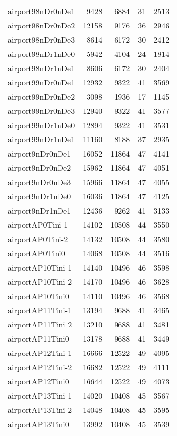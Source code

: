 \begin{longtable}{lrrrr}
airport98nDr0nDe1 & 9428 & 6884 & 31 & 2513 \\
airport98nDr0nDe2 & 12158 & 9176 & 36 & 2946 \\
airport98nDr0nDe3 & 8614 & 6172 & 30 & 2412 \\
airport98nDr1nDe0 & 5942 & 4104 & 24 & 1814 \\
airport98nDr1nDe1 & 8606 & 6172 & 30 & 2404 \\
airport99nDr0nDe1 & 12932 & 9322 & 41 & 3569 \\
airport99nDr0nDe2 & 3098 & 1936 & 17 & 1145 \\
airport99nDr0nDe3 & 12940 & 9322 & 41 & 3577 \\
airport99nDr1nDe0 & 12894 & 9322 & 41 & 3531 \\
airport99nDr1nDe1 & 11160 & 8188 & 37 & 2935 \\
airport9nDr0nDe1 & 16052 & 11864 & 47 & 4141 \\
airport9nDr0nDe2 & 15962 & 11864 & 47 & 4051 \\
airport9nDr0nDe3 & 15966 & 11864 & 47 & 4055 \\
airport9nDr1nDe0 & 16036 & 11864 & 47 & 4125 \\
airport9nDr1nDe1 & 12436 & 9262 & 41 & 3133 \\
airportAP0Tini-1 & 14102 & 10508 & 44 & 3550 \\
airportAP0Tini-2 & 14132 & 10508 & 44 & 3580 \\
airportAP0Tini0 & 14068 & 10508 & 44 & 3516 \\
airportAP10Tini-1 & 14140 & 10496 & 46 & 3598 \\
airportAP10Tini-2 & 14170 & 10496 & 46 & 3628 \\
airportAP10Tini0 & 14110 & 10496 & 46 & 3568 \\
airportAP11Tini-1 & 13194 & 9688 & 41 & 3465 \\
airportAP11Tini-2 & 13210 & 9688 & 41 & 3481 \\
airportAP11Tini0 & 13178 & 9688 & 41 & 3449 \\
airportAP12Tini-1 & 16666 & 12522 & 49 & 4095 \\
airportAP12Tini-2 & 16682 & 12522 & 49 & 4111 \\
airportAP12Tini0 & 16644 & 12522 & 49 & 4073 \\
airportAP13Tini-1 & 14020 & 10408 & 45 & 3567 \\
airportAP13Tini-2 & 14048 & 10408 & 45 & 3595 \\
airportAP13Tini0 & 13992 & 10408 & 45 & 3539 \\

\end{longtable}
